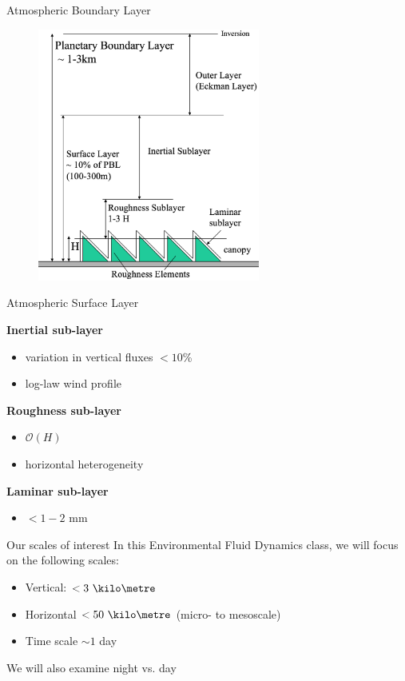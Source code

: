 \begin{frame}{Atmospheric Boundary Layer}
\begin{figure}
	\includegraphics[width=0.65\textwidth]{abl4.png}
\end{figure}
\end{frame}

\begin{frame}{Atmospheric Surface Layer}

\textbf{Inertial sub-layer }
\begin{itemize}
	\item variation in vertical fluxes $<10$\%
	\item log-law wind profile
\end{itemize}

\textbf{Roughness sub-layer }
\begin{itemize}
	\item $\mathcal{O}(H)$
	\item horizontal heterogeneity
\end{itemize}

\textbf{Laminar sub-layer }
\begin{itemize}
	\item $< 1-2$ mm
\end{itemize}
\end{frame}

\begin{frame}{Our scales of interest}
In this Environmental Fluid Dynamics class, we will focus on the following scales:
\begin{itemize}
	\item Vertical: $< 3\ \kilo\metre$
	\item Horizontal $< 50\ \kilo\metre$ (micro- to mesoscale)
	\item Time scale $\sim 1$ day
\end{itemize}

We will also examine night vs. day

\end{frame}

